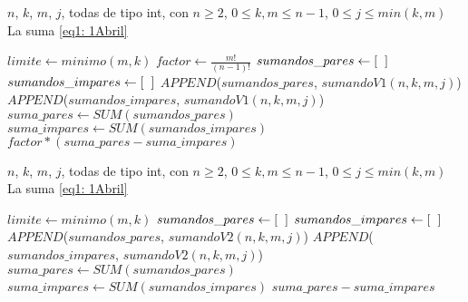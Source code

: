 \begin{algorithm}
\caption{$sumatoriaV1$}\label{alg: sumatoriaV1}
\begin{algorithmic} [1]
\REQUIRE $n$, $k$, $m$, $j$, todas de tipo int, con $n \geq 2$, 
$0 \leq k, m \leq n-1$, $0 \leq j \leq min(k,m)$
\ENSURE La suma \eqref{eq1: 1Abril}

\STATE $limite \leftarrow minimo(m,k)$
\STATE $factor \leftarrow \frac{m!}{(n-1)!}$
\STATE $sumandos\_pares \leftarrow [ \hspace{0.2cm} ]$
\STATE $sumandos\_impares \leftarrow [ \hspace{0.2cm}]$
\STATE $APPEND$($sumandos\_pares$, $sumandoV1(n,k,m,j)$)
\ENDFOR
{} 
\STATE $APPEND$($sumandos\_impares$, $sumandoV1(n,k,m,j)$)
\ENDFOR
\STATE $suma\_pares \leftarrow SUM(sumandos\_pares)$
\STATE $suma\_impares \leftarrow SUM(sumandos\_impares)$
\RETURN $factor * (suma\_pares - suma\_impares)$
\end{algorithmic}
\end{algorithm}

\begin{algorithm}
\caption{$sumatoriaV2$}\label{alg: sumatoriaV2}
\begin{algorithmic} [1]
\REQUIRE $n$, $k$, $m$, $j$, todas de tipo int, con $n \geq 2$, 
$0 \leq k, m \leq n-1$, $0 \leq j \leq min(k,m)$
\ENSURE La suma \eqref{eq1: 1Abril}

\STATE $limite \leftarrow minimo(m,k)$
\STATE $sumandos\_pares \leftarrow [ \hspace{0.2cm} ]$
\STATE $sumandos\_impares \leftarrow [\hspace{0.2cm} ]$
\STATE $APPEND$($sumandos\_pares$, $sumandoV2(n,k,m,j)$)
\ENDFOR
{} 
\STATE $APPEND$($sumandos\_impares$, $sumandoV2(n,k,m,j)$)
\ENDFOR
\STATE $suma\_pares \leftarrow SUM(sumandos\_pares)$
\STATE $suma\_impares \leftarrow SUM(sumandos\_impares)$
\RETURN $suma\_pares - suma\_impares$
\end{algorithmic}
\end{algorithm}



